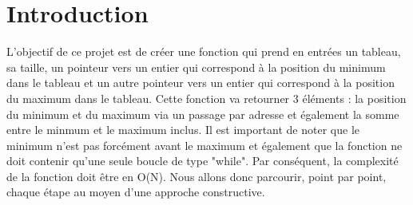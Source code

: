 \section{Introduction}\label{introduction}
L'objectif de ce projet est de créer une fonction qui prend en entrées un tableau, sa taille, un pointeur vers un entier qui correspond à la position du minimum dans le tableau et un autre pointeur vers un entier qui correspond à la position du maximum dans le tableau. Cette fonction va retourner 3 éléments : la position du minimum et du maximum via un passage par adresse et également la somme entre le minmum et le maximum inclus. Il est important de noter que le minimum n'est pas forcément avant le maximum et également que la fonction ne doit contenir qu'une seule boucle de type "while". Par conséquent, la complexité de la fonction doit être en O(N). Nous allons donc parcourir, point par point, chaque étape au moyen d'une approche constructive.
